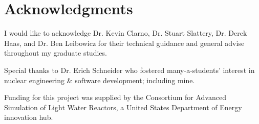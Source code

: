
\section*{Acknowledgments}

I would like to acknowledge Dr. Kevin Clarno, Dr. Stuart Slattery, Dr. Derek Haas, and Dr. Ben Leibowicz for their technical guidance and general advise throughout my graduate studies.

Special thanks to Dr. Erich Schneider who fostered many-a-students' interest in nuclear engineering \& software development; including mine. 

Funding for this project was supplied by the Consortium for Advanced Simulation of Light Water Reactors, a United States Department of Energy innovation hub.

\newpage
